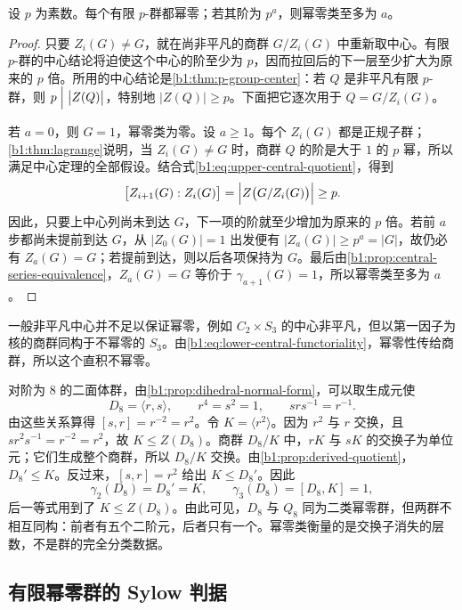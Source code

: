 \begin{theorem}[有限 \(p\)-群的幂零性]\label{b1:thm:p-group-nilpotent}
	设 \(p\) 为素数。每个有限 \(p\)-群都幂零；若其阶为 \(p^a\)，则幂零类至多为 \(a\)。
\end{theorem}
\begin{proof}
	只要 \(Z_i(G)\ne G\)，就在尚非平凡的商群 \(G/Z_i(G)\) 中重新取中心。有限 \(p\)-群的中心结论将迫使这个中心的阶至少为 \(p\)，因而拉回后的下一层至少扩大为原来的 \(p\) 倍。所用的中心结论是\cref{b1:thm:p-group-center}：若 \(Q\) 是非平凡有限 \(p\)-群，则 \(p\Bigm\vert\bigl|Z(Q)\bigr|\)，特别地 \(\bigl|Z(Q)\bigr|\ge p\)。下面把它逐次用于 \(Q=G/Z_i(G)\)。

	若 \(a=0\)，则 \(G=1\)，幂零类为零。设 \(a\ge1\)。每个 \(Z_i(G)\) 都是正规子群；\cref{b1:thm:lagrange}说明，当 \(Z_i(G)\ne G\) 时，商群 \(Q\) 的阶是大于 \(1\) 的 \(p\) 幂，所以满足中心定理的全部假设。结合式\eqref{b1:eq:upper-central-quotient}，得到
	\[
		\bigl[Z_{i+1}(G):Z_i(G)\bigr] =\Bigl|Z\bigl(G/Z_i(G)\bigr)\Bigr|\ge p.
	\]
	因此，只要上中心列尚未到达 \(G\)，下一项的阶就至少增加为原来的 \(p\) 倍。若前 \(a\) 步都尚未提前到达 \(G\)，从 \(\bigl|Z_0(G)\bigr|=1\) 出发便有 \(\bigl|Z_a(G)\bigr|\ge p^a=|G|\)，故仍必有 \(Z_a(G)=G\)；若提前到达，则以后各项保持为 \(G\)。最后由\cref{b1:prop:central-series-equivalence}，\(Z_a(G)=G\) 等价于 \(\gamma_{a+1}(G)=1\)，所以幂零类至多为 \(a\)。
\end{proof}

一般非平凡中心并不足以保证幂零，例如 \(C_2\times S_3\) 的中心非平凡，但以第一因子为核的商群同构于不幂零的 \(S_3\)。由\eqref{b1:eq:lower-central-functoriality}，幂零性传给商群，所以这个直积不幂零。

\ProseParagraphBreak
对阶为 \(8\) 的二面体群，由\cref{b1:prop:dihedral-normal-form}，可以取生成元使
\[
	D_8=\langle r,s\rangle,\qquad r^4=s^2=1,\qquad srs^{-1}=r^{-1}.
\]
由这些关系算得 \([s,r]=r^{-2}=r^2\)。令 \(K=\langle r^2\rangle\)。因为 \(r^2\) 与 \(r\) 交换，且 \(sr^2s^{-1}=r^{-2}=r^2\)，故 \(K\le Z(D_8)\)。商群 \(D_8/K\) 中，\(rK\) 与 \(sK\) 的交换子为单位元；它们生成整个商群，所以 \(D_8/K\) 交换。由\cref{b1:prop:derived-quotient}，\(D_8'\le K\)。反过来，\([s,r]=r^2\) 给出 \(K\le D_8'\)。因此
\[
	\gamma_2(D_8)=D_8'=K,\qquad \gamma_3(D_8)=[D_8,K]=1,
\]
后一等式用到了 \(K\le Z(D_8)\)。由此可见，\(D_8\) 与 \(Q_8\) 同为二类幂零群，但两群不相互同构：前者有五个二阶元，后者只有一个。幂零类衡量的是交换子消失的层数，不是群的完全分类数据。

\subsection{有限幂零群的 Sylow 判据}
\label{b1:subsec:0703:03}

